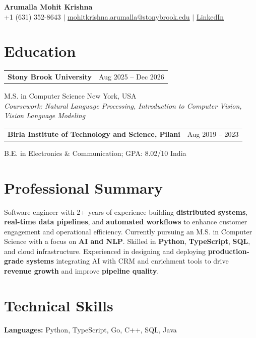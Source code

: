 \documentclass[letterpaper,10pt]{article}
\makeatletter
\newcommand{\entry}[2]{%
  \noindent
  \begin{tabularx}{\linewidth}
    {@{}>{\raggedright\arraybackslash}X@{\hspace{6pt}}r@{}}
    \textbf{#1} & #2
  \end{tabularx}\par
}
\makeatother
\begin{document}
\begin{center}
    {\LARGE\bfseries Arumalla Mohit Krishna}\\[3pt]
    +1 (631) 352-8643 $|$
    \href{mailto:mohitkrishna.arumalla@stonybrook.edu}
    {mohitkrishna.arumalla@stonybrook.edu} $|$
    \href{https://linkedin.com/in/mohit-krishna-arumalla}
    {LinkedIn} \\
\end{center}
\vspace{-8pt}

\section{Education}

\entry
  {\textbf{Stony Brook University}}
  {Aug 2025 -- Dec 2026}

M.S. in Computer Science \hfill New York, USA\\
\textit{
Coursework: Natural Language Processing,
Introduction to Computer Vision, Vision Language Modeling
}
\vspace{3pt}

\entry
  {\textbf{Birla Institute of Technology and Science, Pilani}}
  {Aug 2019 -- 2023}

B.E. in Electronics \& Communication; GPA: 8.02/10 \hfill India
\section{Professional Summary}

Software engineer with 2+ years of experience building \textbf{distributed systems}, \textbf{real-time data pipelines}, and \textbf{automated workflows} to enhance customer engagement and operational efficiency. Currently pursuing an M.S. in Computer Science with a focus on \textbf{AI and NLP}. Skilled in \textbf{Python}, \textbf{TypeScript}, \textbf{SQL}, and cloud infrastructure. Experienced in designing and deploying \textbf{production-grade systems} integrating AI with CRM and enrichment tools to drive \textbf{revenue growth} and improve \textbf{pipeline quality}.

\section{Technical Skills}

\textbf{Languages:}
Python, TypeScript, Go, C++, SQL, Java\\
\end{document}
